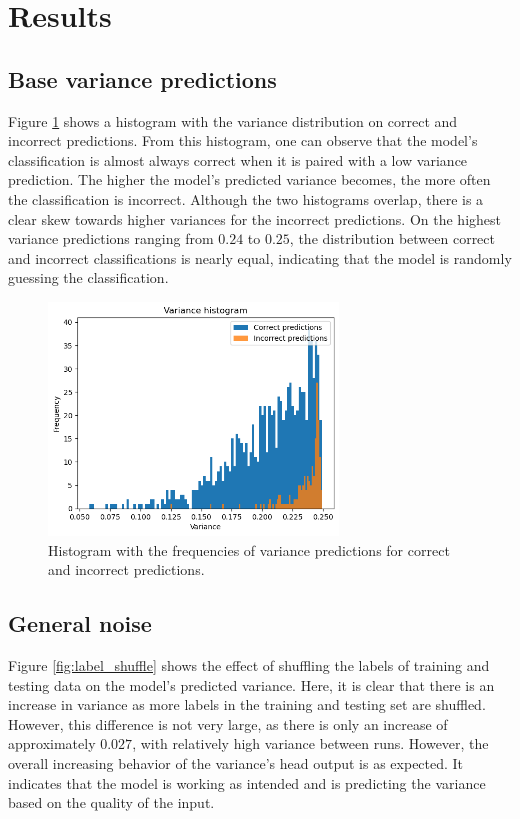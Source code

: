 \section{Results}\label{sec:results}


\subsection{Base variance predictions}

Figure \ref{fig:histogram} shows a histogram with the variance distribution on correct and incorrect predictions. From this histogram, one can observe that the model's classification is almost always correct when it is paired with a low variance prediction. The higher the model's predicted variance becomes, the more often the classification is incorrect. Although the two histograms overlap, there is a clear skew towards higher variances for the incorrect predictions. On the highest variance predictions ranging from $0.24$ to $0.25$, the distribution between correct and incorrect classifications is nearly equal, indicating that the model is randomly guessing the classification.

\begin{figure}[!tbp]
    \centering
        \includegraphics[width=7.7cm]{img/histogram.png}
    \caption{Histogram with the frequencies of variance predictions for correct and incorrect predictions.}
    \label{fig:histogram}
\end{figure}


\subsection{General noise}

Figure \ref{fig:label_shuffle} shows the effect of shuffling the labels of training and testing data on the model's predicted variance. Here, it is clear that there is an increase in variance as more labels in the training and testing set are shuffled. However, this difference is not very large, as there is only an increase of approximately $0.027$, with relatively high variance between runs. However, the overall increasing behavior of the variance's head output is as expected. It indicates that the model is working as intended and is predicting the variance based on the quality of the input.

